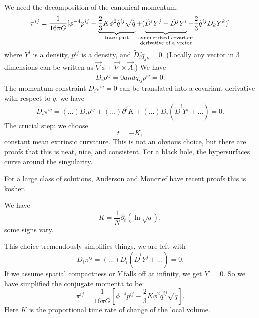 We need the decomposition of the canonical momentum:
\begin{equation}
\pi^{ij} = \frac{1}{16\pi G}[\phi^{-4}p^{ij} -
  \underbrace{\frac{2}{3}K\phi^{2}\widetilde{q}^{ij}\sqrt{\widetilde{q}}}_{\text{trace part}}
  + (\underbrace{\vphantom{\frac{2}{3}}\widetilde{D}^{i}Y^{j} + \widetilde{D}^{j}Y^{i}}_{\mathclap{\substack{\text{symmetrized covariant}\\\text{derivative of a vector}}}}
  -\frac{2}{3}\widetilde{q}^{ij}D_{k}Y^{k})]
\end{equation}
where $Y^{i}$ is a density, $p^{ij}$ is a density, and $\widetilde{D}_{i}\widetilde{q}_{jk}=0$.
(Locally any vector
in 3 dimensions can be written as $\vec{\nabla}\phi + \vec{\nabla}\times\vec{A}$.)
We have
\begin{subequations}
\begin{equation}
\widetilde{D}_{i}p^{ij} = 0
\end{equation}
and
\begin{equation}
\widetilde{q}_{ij}p^{ij}=0.
\end{equation}
\end{subequations}
The momentum constraint $D_{i}\pi^{ij}=0$ can be translated into a
covariant derivative with respect to $\widetilde{q}$, we have
\begin{equation}
D_{i}\pi^{ij} = (\dots)\widetilde{D}_{i}p^{ij} + (\dots)\partial^{j}K + (\dots)\widetilde{D}_{i}(\widetilde{D}^{i}Y^{j}+\dots)=0.
\end{equation}
%
The crucial step: we choose
\begin{equation}
t = -K,
\end{equation}
constant mean extrinsic curvature. This is not an obvious choice, but
there are proofs that this is neat, nice, and consistent. For a black
hole, the hypersurfaces curve around the singularity.

For a large class of solutions, Anderson and Moncrief have recent proofs
this is kosher.

We have
\begin{equation}
K = \frac{1}{N}\partial_{t}(\ln\sqrt{q}),
\end{equation}
some signs vary.

This choice tremendously simplifies things, we are left with
\begin{equation}
D_{i}\pi^{ij} = (\dots)\widetilde{D}_{i}(\widetilde{D}^{i}Y^{j}+\dots) = 0.
\end{equation}
If we assume spatial compactness or $Y$ falls off at infinity, we get
$Y^{i}=0$. So we have simplified the conjugate momenta to be:
\begin{equation}
\pi^{ij} = \frac{1}{16\pi G}[\phi^{-4}p^{ij} - \frac{2}{3}K\phi^{2}\widetilde{q}^{ij}\sqrt{\widetilde{q}}].
\end{equation}
Here $K$ is the proportional time rate of change of the local volume.

